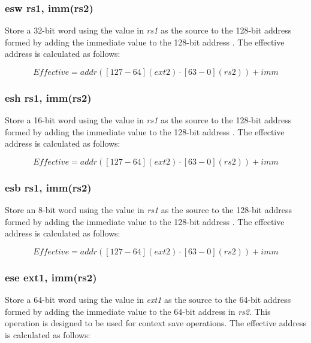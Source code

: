 \documentclass{article}
\begin{document}
\subsubsection{esw rs1, imm(rs2)}
Store a 32-bit word using the value in \textit{rs1} as the source 
to the 128-bit address formed by adding the immediate value to the 
128-bit address .  The effective address is calculated 
as follows: 

\begin{equation}
Effective = addr([127-64](ext2) \cdot [63-0](rs2))+imm
\end{equation}

\subsubsection{esh rs1, imm(rs2)}
Store a 16-bit word using the value in \textit{rs1} as the source 
to the 128-bit address formed by adding the immediate value to the 
128-bit address .  The effective address is calculated 
as follows: 

\begin{equation}
Effective = addr([127-64](ext2) \cdot [63-0](rs2))+imm
\end{equation}

\subsubsection{esb rs1, imm(rs2)}
Store an 8-bit word using the value in \textit{rs1} as the source 
to the 128-bit address formed by adding the immediate value to the 
128-bit address .  The effective address is calculated 
as follows: 

\begin{equation}
Effective = addr([127-64](ext2) \cdot [63-0](rs2))+imm
\end{equation}

\subsubsection{ese ext1, imm(rs2)}
Store a 64-bit word using the value in \textit{ext1} as the source to the 
64-bit address formed by adding the immediate value to the 64-bit 
address in \textit{rs2}.  This operation is designed to be used for 
context save operations.  The effective address is calculated as follows: 
\end{document}
